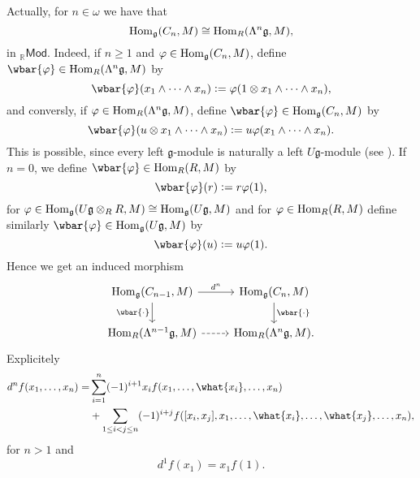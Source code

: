 \begin{remark}
	Actually, for $n \in \omega$ we have that 
	\begin{equation*}
		\operatorname{Hom}_\mathfrak{g}(C_n,M) \cong \operatorname{Hom}_R(\Lambda^n \mathfrak{g},M),
	\end{equation*}
	\noindent in $_{\mathbb{R}}\mathsf{Mod}$. Indeed, if $n \geq 1$ and $\varphi \in \operatorname{Hom}_\mathfrak{g}(C_n,M)$, define $\wbar{\varphi} \in \Hom_R(\Lambda^n \mathfrak{g},M)$ by 
	\begin{equation*}
		\wbar{\varphi}(x_1 \wedge \dots \wedge x_n) := \varphi(1 \otimes x_1 \wedge \dots \wedge x_n),
	\end{equation*}
	\noindent and conversly, if $\varphi \in \operatorname{Hom}_R(\Lambda^n \mathfrak{g},M)$, define $\wbar{\varphi} \in \Hom_\mathfrak{g}(C_n,M)$ by
	\begin{equation*}
		\wbar{\varphi}(u \otimes x_1 \wedge \dots \wedge x_n) := u \varphi(x_1 \wedge \dots \wedge x_n).
	\end{equation*}
	\noindent This is possible, since every left $\mathfrak{g}$-module is naturally a left $U\mathfrak{g}$-module (see \cite[224--225]{weibel:homological_algebra:1994}). If $n = 0$, we define $\wbar{\varphi} \in \Hom_R(R,M)$ by 
	\begin{equation*}
		\wbar{\varphi}(r) := r\varphi(1),
	\end{equation*}
	\noindent for $\varphi \in \operatorname{Hom}_\mathfrak{g}(U\mathfrak{g} \otimes_R R,M) \cong \operatorname{Hom}_\mathfrak{g}(U\mathfrak{g},M)$ and for $\varphi \in \operatorname{Hom}_R(R,M)$ define similarly $\wbar{\varphi} \in \Hom_\mathfrak{g}(U\mathfrak{g},M)$ by
	\begin{equation*}
		\wbar{\varphi}(u) := u\varphi(1).
	\end{equation*}
	Hence we get an induced morphism 
	\begin{equation*}
		\begin{tikzcd}
			\Hom_\mathfrak{g}(C_{n - 1},M) \arrow[r,"d^n"]\arrow[d,"\wbar{\cdot}"'] & \Hom_\mathfrak{g}(C_n,M)\arrow[d,"\wbar{\cdot}"]\\
			\Hom_R(\Lambda^{n - 1}\mathfrak{g},M) \arrow[r,dashed] & \Hom_R(\Lambda^n\mathfrak{g},M).
		\end{tikzcd}
	\end{equation*}
	Explicitely
	\begin{align*}
		d^nf(x_1,\dots,x_n) =& \sum_{i = 1}^n(-1)^{i + 1}x_i f(x_1,\dots,\what{x_i},\dots,x_n)\\
		&+ \sum_{1 \leq i < j \leq n}(-1)^{i + j} f([x_i,x_j],x_1,\dots,\what{x_i},\dots,\what{x_j},\dots,x_n),
	\end{align*}
	\noindent for $n > 1$ and 
	\begin{equation*}
		d^1f(x_1) = x_1f(1).
	\end{equation*}
\end{remark}

